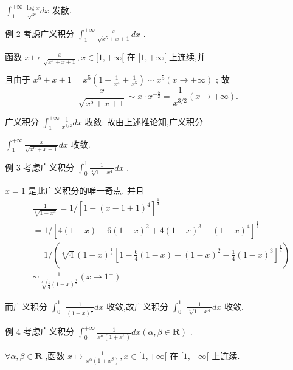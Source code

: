 ${\int }_{1}^{+\infty }\frac{\log x}{\sqrt{x}}{dx}$ 发散.

例 2 考虑广义积分 ${\int }_{1}^{+\infty }\frac{x}{\sqrt{{x}^{5} + x + 1}}{dx}$ .

函数 $x \mapsto  \frac{x}{\sqrt{{x}^{5} + x + 1}},x \in  \lbrack 1, + \infty \lbrack$ 在 $\lbrack 1, + \infty \lbrack$ 上连续,并

且由于 ${x}^{5} + x + 1 = {x}^{5}\left( {1 + \frac{1}{{x}^{4}} + \frac{1}{{x}^{5}}}\right)  \sim  {x}^{5}\left( {x \rightarrow   + \infty }\right)$ ; 故
$$\frac{x}{\sqrt{{x}^{5} + x + 1}} \sim  x \cdot  {x}^{-\frac{5}{2}} = \frac{1}{{x}^{3/2}}\left( {x \rightarrow   + \infty }\right) .$$

广义积分 ${\int }_{1}^{+\infty }\frac{1}{{x}^{3/2}}{dx}$ 收敛: 故由上述推论知,广义积分

${\int }_{1}^{+\infty }\frac{x}{\sqrt{{x}^{6} + x + 1}}{dx}$ 收敛.

例 3 考虑广义积分 ${\int }_{0}^{1}\frac{1}{\sqrt[4]{1 - {x}^{4}}}{dx}$ .

$x = 1$ 是此广义积分的唯一奇点. 并且
\begin{align*}
	&\frac{1}{\sqrt[4]{1 - {x}^{4}}} = 1/{\left\lbrack  1 - {\left( x - 1 + 1\right) }^{4}\right\rbrack  }^{\frac{1}{4}}\\
	&= 1/{\left\lbrack  4\left( 1 - x\right)  - 6{\left( 1 - x\right) }^{2} + 4{\left( 1 - x\right) }^{3} - {\left( 1 - x\right) }^{4}\right\rbrack  }^{\frac{1}{4}}\\
	&= 1/\left( {\sqrt[4]{4}{\left( 1 - x\right) }^{\frac{1}{4}}{\left\lbrack  1 - \frac{6}{4}\left( 1 - x\right)  + {\left( 1 - x\right) }^{2} - \frac{1}{4}{\left( 1 - x\right) }^{3}\right\rbrack  }^{\frac{1}{4}}}\right)\\
	&\sim  \frac{1}{\sqrt[4]{\frac{1}{4}{\left( 1 - x\right) }^{\frac{1}{4}}}}\left( {x \rightarrow  {1}^{ - }}\right)
\end{align*}

而广义积分 ${\int }_{0}^{{1}^{ - }}\frac{1}{{\left( 1 - x\right) }^{\frac{1}{4}}}{dx}$ 收敛,故广义积分 ${\int }_{0}^{{1}^{ - }}\frac{1}{\sqrt[4]{1 - {x}^{4}}}{dx}$ 收敛.

例 4 考虑广义积分 ${\int }_{0}^{+\infty }\frac{1}{{x}^{\alpha }\left( {1 + {x}^{\beta }}\right) }{dx}\left( {\alpha ,\beta  \in  \mathbf{R}}\right)$ .

$\forall \alpha ,\beta  \in  \mathbf{R}$ ,函数 $x \mapsto  \frac{1}{{x}^{\alpha }\left( {1 + {x}^{\beta }}\right) },x \in  \lbrack 1, + \infty \lbrack$ 在 $\lbrack 1, + \infty \lbrack$ 上连续.

